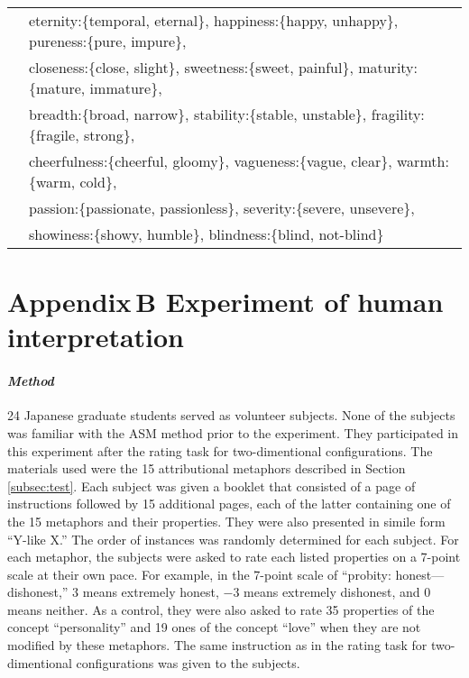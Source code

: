 \begin{table}[t]
\begin{tabular}{l@{~~~}l}
    & eternity:\{temporal, eternal\}, happiness:\{happy, unhappy\}, pureness:\{pure, impure\},\\
    & closeness:\{close, slight\}, sweetness:\{sweet, painful\}, maturity:\{mature, immature\},\\
    & breadth:\{broad, narrow\}, stability:\{stable, unstable\}, fragility:\{fragile, strong\},\\
    & cheerfulness:\{cheerful, gloomy\}, vagueness:\{vague, clear\}, warmth:\{warm, cold\}, \\
    & passion:\{passionate, passionless\}, severity:\{severe, unsevere\}, \\
    & showiness:\{showy, humble\}, blindness:\{blind, not-blind\}\\ \hline
  \end{tabular}
\end{table}

\section*{Appendix\,B\hspace*{2ex} Experiment of human interpretation}
\paragraph{\it Method} 
24 Japanese graduate students served as volunteer subjects. 
None of the subjects was familiar with the ASM method prior to the experiment.
They participated in this experiment after the rating task for two-dimentional
configurations.
The materials used were the 15 attributional metaphors described in 
Section\,\ref{subsec:test}.
Each subject was given a booklet that consisted of a page of
instructions followed by 15 additional pages, each of the latter
containing one of the 15 metaphors and their properties.
They were also presented in simile form ``Y-like X.'' 
The order of instances was randomly determined for each
subject.  For each metaphor, the subjects were asked to rate 
each listed properties on a 7-point scale at their own pace. 
For example, in the 7-point scale of ``probity: honest---dishonest,'' 
$3$ means extremely honest, $-3$ means extremely dishonest, and $0$ means neither. 
As a control, they were also asked to rate 35 properties of the concept 
``personality'' and 19 ones of the concept ``love'' 
when they are not modified by these metaphors.
The same instruction as in the rating task for two-dimentional 
configurations was given to the subjects.

